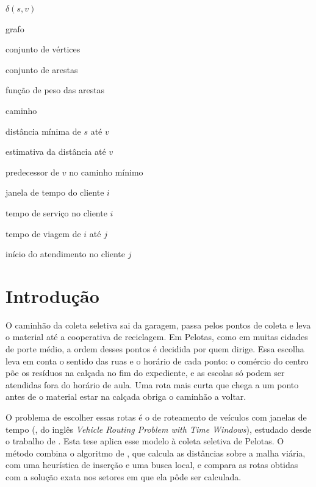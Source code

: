 \documentclass[tese,capa]{texufpel}
\begin{document}
\begin{listofsymbols}{$\delta(s, v)$}
  \item[$G$]            grafo
  \item[$V$]            conjunto de vértices
  \item[$E$]            conjunto de arestas
  \item[$w$]            função de peso das arestas
  \item[$p$]            caminho
  \item[$\delta(s, v)$] distância mínima de $s$ até $v$
  \item[{$d[v]$}]       estimativa da distância até $v$
  \item[{$\pi[v]$}]     predecessor de $v$ no caminho mínimo
  \item[{$[a_i, b_i]$}] janela de tempo do cliente $i$
  \item[$s_i$]          tempo de serviço no cliente $i$
  \item[$\tau_{ij}$]    tempo de viagem de $i$ até $j$
  \item[$t_j$]          início do atendimento no cliente $j$
\end{listofsymbols}

\tableofcontents

\chapter{Introdução}
\label{cap:introducao}

O caminhão da coleta seletiva sai da garagem, passa pelos pontos de coleta e
leva o material até a cooperativa de reciclagem. Em Pelotas, como em muitas
cidades de porte médio, a ordem desses pontos é decidida por quem dirige.
Essa escolha leva em conta o sentido das ruas e o horário de cada ponto: o
comércio do centro põe os resíduos na calçada no fim do expediente, e as
escolas só podem ser atendidas fora do horário de aula. Uma rota mais curta
que chega a um ponto antes de o material estar na calçada obriga o caminhão a
voltar.

O problema de escolher essas rotas é o de roteamento de veículos com janelas
de tempo (, do
inglês \textit{Vehicle Routing Problem with Time Windows}), estudado desde o
trabalho de \citet{Solomon:1987:AVR}. Esta tese aplica esse modelo à coleta
seletiva de Pelotas. O método combina o algoritmo de
\citet{Dijkstra:1959:NTP}, que calcula as distâncias sobre a malha viária,
com uma heurística de inserção e uma busca local, e compara as rotas obtidas
com a solução exata nos setores em que ela pôde ser calculada.
\end{document}
